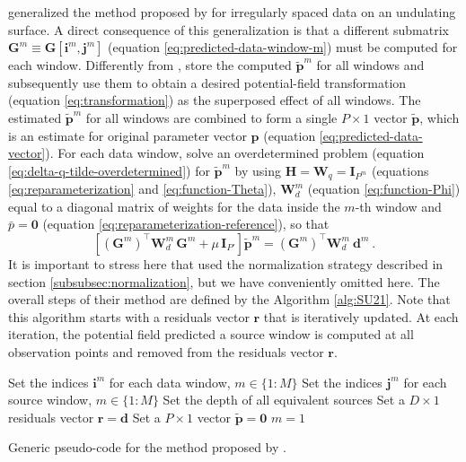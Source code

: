\cite{soler-uieda2021} generalized the method proposed by \cite{leao-silva1989} for irregularly spaced data on an undulating surface.
A direct consequence of this generalization is that a different submatrix $\mathbf{G}^{m} \equiv \mathbf{G}[\mathbf{i}^{m}, \mathbf{j}^{m}]$ 
(equation \ref{eq:predicted-data-window-m}) must be computed for each window.
Differently from \cite{leao-silva1989}, \cite{soler-uieda2021} store the computed $\tilde{\mathbf{p}}^{m}$ for all windows and
subsequently use them to obtain a desired potential-field transformation (equation \ref{eq:transformation}) as the superposed
effect of all windows.
The estimated $\tilde{\mathbf{p}}^{m}$ for all windows are combined to form a single $P \times 1$ vector $\tilde{\mathbf{p}}$,
which is an estimate for original parameter vector $\mathbf{p}$ (equation \ref{eq:predicted-data-vector}).
For each data window, \cite{soler-uieda2021} solve an overdetermined problem (equation \ref{eq:delta-q-tilde-overdetermined}) 
for $\tilde{\mathbf{p}}^{m}$ by using 
$\mathbf{H} = \mathbf{W}_{q} = \mathbf{I}_{P^{m}}$ (equations \ref{eq:reparameterization} and \ref{eq:function-Theta}),
$\mathbf{W}^{m}_{d}$ (equation \ref{eq:function-Phi}) equal to a diagonal matrix of weights for the data inside the $m$-th window
and $\bar{p} = \mathbf{0}$ (equation \ref{eq:reparameterization-reference}), so that
\begin{equation}
	\left[ \left( \mathbf{G}^{m} \right)^{\top} \mathbf{W}^{m}_{d} \, \mathbf{G}^{m} + 
	\mu \, \mathbf{I}_{P'} \right] 
	\tilde{\mathbf{p}}^{m} = 
	\left( \mathbf{G}^{m} \right)^{\top} \mathbf{W}^{m}_{d} \: 
	\mathbf{d}^{m} \: .
	\label{eq:p-tilde-m-SU21}
\end{equation}
It is important to stress here that \cite{soler-uieda2021} used the normalization strategy described in section \ref{subsubsec:normalization},
but we have conveniently omitted here.
The overall steps of their method are defined by the Algorithm \ref{alg:SU21}.
Note that this algorithm starts with a residuals vector $\mathbf{r}$ that is iteratively updated.
At each iteration, the potential field predicted a source window is computed at all observation points and removed from the
residuals vector $\mathbf{r}$.

\begin{algorithm}
	\Input{}
	Set the indices $\mathbf{i}^{m}$ for each data window, $m \in \{ 1 : M \}$ \;
	Set the indices $\mathbf{j}^{m}$ for each source window, $m \in \{ 1 : M \}$ \;
	Set the depth of all equivalent sources \;
	Set a $D \times 1$ residuals vector $\mathbf{r} = \mathbf{d}$ \;
	Set a $P \times 1$ vector $\tilde{\mathbf{p}} = \mathbf{0}$ \;
	$m = 1$ \;
	\caption{Generic pseudo-code for the method proposed by \cite{soler-uieda2021}.}
	\label{alg:SU21}
\end{algorithm}

